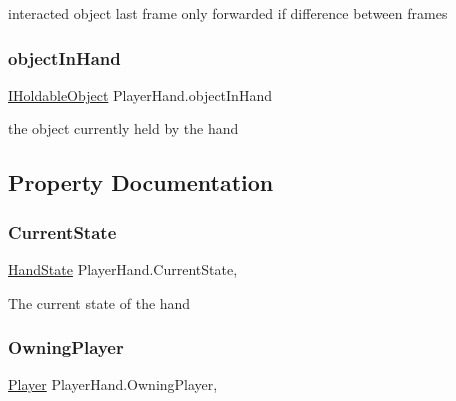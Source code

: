 interacted object last frame only forwarded if difference between frames 

\mbox{\label{class_player_hand_a043a1be665181f9e3c9d00cd18e4c4fe}} 
\subsubsection{\texorpdfstring{object\+In\+Hand}{objectInHand}}
{\footnotesize\ttfamily \mbox{\hyperlink{interface_i_holdable_object}{I\+Holdable\+Object}} Player\+Hand.\+object\+In\+Hand\hspace{0.3cm}{\ttfamily [protected]}}



the object currently held by the hand 



\subsection{Property Documentation}
\mbox{\label{class_player_hand_a6eb1eff28793294622f4037a0aa7afeb}} 
\subsubsection{\texorpdfstring{Current\+State}{CurrentState}}
{\footnotesize\ttfamily \mbox{\hyperlink{class_player_hand_a1af76750da713cbc88856161d8d5ac0e}{Hand\+State}} Player\+Hand.\+Current\+State\hspace{0.3cm}{\ttfamily [get]}, {}}



The current state of the hand 

\mbox{\label{class_player_hand_a0d33095483c291ac3dd5b5350974b626}} 
\subsubsection{\texorpdfstring{Owning\+Player}{OwningPlayer}}
{\footnotesize\ttfamily \mbox{\hyperlink{class_player}{Player}} Player\+Hand.\+Owning\+Player\hspace{0.3cm}{\ttfamily [get]}, {\ttfamily [set]}}



